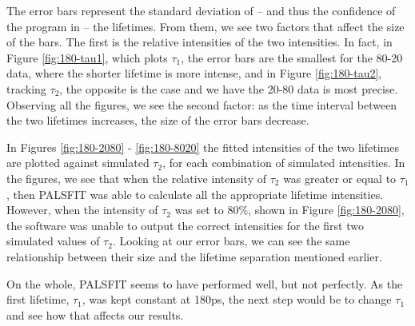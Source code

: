 The error bars represent the standard deviation of -- and thus the confidence of the program in -- the lifetimes. From them, we see two factors that affect the size of the bars. The first is the relative intensities of the two intensities. In fact, in Figure \ref{fig:180-tau1}, which plots $\tau_1$, the error bars are the smallest for the 80-20 data, where the shorter lifetime is more intense, and in Figure \ref{fig:180-tau2}, tracking $\tau_2$, the opposite is the case and we have the 20-80 data is most precise. Observing all the figures, we see the second factor: as the time interval between the two lifetimes increases, the size of the error bars decrease.

In Figures \ref{fig:180-2080} - \ref{fig:180-8020} the fitted intensities of the two lifetimes are plotted against simulated $\tau_2$, for each combination of simulated intensities. In the figures, we see that when the relative intensity of $\tau_2$ was greater or equal to $\tau_1$, then PALSFIT was able to calculate all the appropriate lifetime intensities. However, when the intensity of $\tau_2$ was set to 80\%, shown in Figure \ref{fig:180-2080}, the software was unable to output the correct intensities for the first two simulated values of $\tau_2$. Looking at our error bars, we can see the same relationship between their size and the lifetime separation mentioned earlier.

On the whole, PALSFIT seems to have performed well, but not perfectly. As the first lifetime, $\tau_1$, was kept constant at 180ps, the next step would be to change $\tau_1$ and see how that affects our results. 


